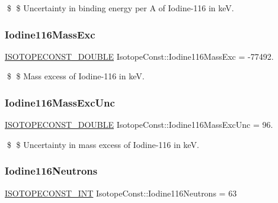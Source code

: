 \$ \$ Uncertainty in binding energy per A of Iodine-\/116 in keV. \mbox{\label{group___isotope_const-_iodine-_i116_ga9630c8aece91a9368e2cef5026c3b6a2}} 
\subsubsection{\texorpdfstring{Iodine116\+Mass\+Exc}{Iodine116MassExc}}
{\footnotesize\ttfamily \mbox{\hyperlink{group___isotope_const-_macros_ga8f45a7272ce02c0b4c65c44636ed719a}{I\+S\+O\+T\+O\+P\+E\+C\+O\+N\+S\+T\+\_\+\+D\+O\+U\+B\+LE}} Isotope\+Const\+::\+Iodine116\+Mass\+Exc = -\/77492.}

\$ \$ Mass excess of Iodine-\/116 in keV. \mbox{\label{group___isotope_const-_iodine-_i116_ga6809f39b9206efbf3dc78155f52bdd70}} 
\subsubsection{\texorpdfstring{Iodine116\+Mass\+Exc\+Unc}{Iodine116MassExcUnc}}
{\footnotesize\ttfamily \mbox{\hyperlink{group___isotope_const-_macros_ga8f45a7272ce02c0b4c65c44636ed719a}{I\+S\+O\+T\+O\+P\+E\+C\+O\+N\+S\+T\+\_\+\+D\+O\+U\+B\+LE}} Isotope\+Const\+::\+Iodine116\+Mass\+Exc\+Unc = 96.}

\$ \$ Uncertainty in mass excess of Iodine-\/116 in keV. \mbox{\label{group___isotope_const-_iodine-_i116_ga747294018371df31e96a2fee73fae4df}} 
\subsubsection{\texorpdfstring{Iodine116\+Neutrons}{Iodine116Neutrons}}
{\footnotesize\ttfamily \mbox{\hyperlink{group___isotope_const-_macros_ga5f18360b3e99483a35c32d789e62621c}{I\+S\+O\+T\+O\+P\+E\+C\+O\+N\+S\+T\+\_\+\+I\+NT}} Isotope\+Const\+::\+Iodine116\+Neutrons = 63}

